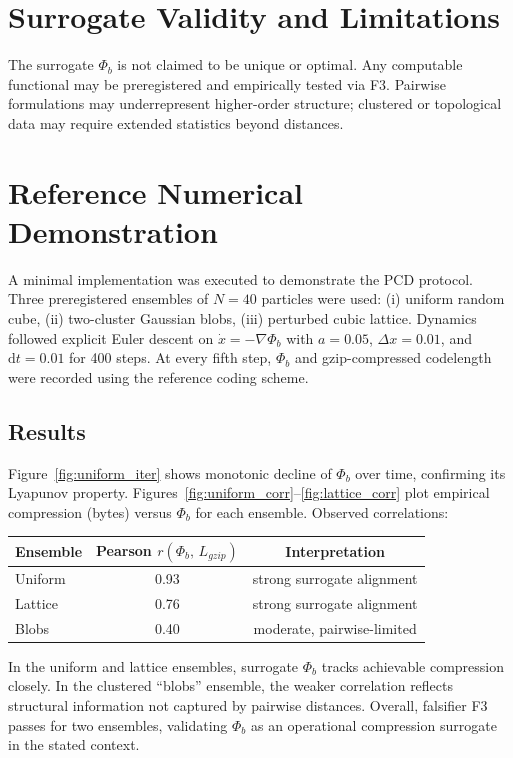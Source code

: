 \documentclass[11pt]{article}
\begin{document}
\section{Surrogate Validity and Limitations}
The surrogate $\Phi_b$ is not claimed to be unique or optimal.
Any computable functional may be preregistered and empirically tested via F3.
Pairwise formulations may underrepresent higher-order structure; clustered or topological data may require extended statistics beyond distances.

\section{Reference Numerical Demonstration}
A minimal implementation was executed to demonstrate the PCD protocol.
Three preregistered ensembles of \(N=40\) particles were used:
(i) uniform random cube,
(ii) two-cluster Gaussian blobs,
(iii) perturbed cubic lattice.
Dynamics followed explicit Euler descent on $\dot{x}=-\nabla\Phi_b$ with $a=0.05$, $\Delta x=0.01$, and $\mathrm{d}t=0.01$ for 400 steps.
At every fifth step, $\Phi_b$ and gzip-compressed codelength were recorded using the reference coding scheme.

\subsection*{Results}
Figure~\ref{fig:uniform_iter} shows monotonic decline of $\Phi_b$ over time, confirming its Lyapunov property.
Figures~\ref{fig:uniform_corr}–\ref{fig:lattice_corr} plot empirical compression (bytes) versus $\Phi_b$ for each ensemble.
Observed correlations:

\begin{center}
\begin{tabular}{lcc}
\hline
Ensemble & Pearson $r(\Phi_b,\,L_{gzip})$ & Interpretation \\
\hline
Uniform & 0.93 & strong surrogate alignment \\
Lattice & 0.76 & strong surrogate alignment \\
Blobs   & 0.40 & moderate, pairwise-limited \\
\hline
\end{tabular}
\end{center}

In the uniform and lattice ensembles, surrogate $\Phi_b$ tracks achievable compression closely.
In the clustered “blobs” ensemble, the weaker correlation reflects structural information not captured by pairwise distances.
Overall, falsifier F3 passes for two ensembles, validating $\Phi_b$ as an operational compression surrogate in the stated context.
\end{document}
